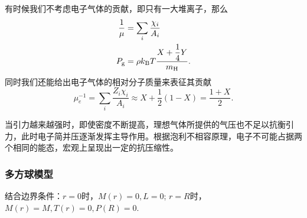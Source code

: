 \documentclass[../天体物理基础.tex]{subfiles}
\begin{document}
有时候我们不考虑电子气体的贡献，即只有一大堆离子，那么
\begin{align}
\frac{1}{\mu}&=\sum_{i}\frac{\chi_{i}}{A_{i}}\\
P_{\text{g}}&=\rho k_{\text{B}}T\frac{X+\dfrac{1}{4}Y}{m_{\ce{H}}}.
\end{align}
同时我们还能给出电子气体的相对分子质量来表征其贡献
\begin{equation}
\mu_{e}^{-1}=\sum_{i}\frac{Z_{i}\chi_{i}}{A_{i}}\approx X+\frac{1}{2}(1-X)=\frac{1+X}{2}.
\end{equation}

当引力越来越强时，即使密度不断提高，理想气体所提供的气压也不足以抗衡引力，此时电子简并压逐渐发挥主导作用。根据泡利不相容原理，电子不可能占据两个相同的能态，宏观上呈现出一定的抗压缩性。

\subsubsection{多方球模型}
结合边界条件：$r=0$时，$M\left(r\right)=0,L=0$; $r=R$时，$M\left(r\right)=M,T\left(r\right)=0,P\left(R\right)=0$.
\end{document}
